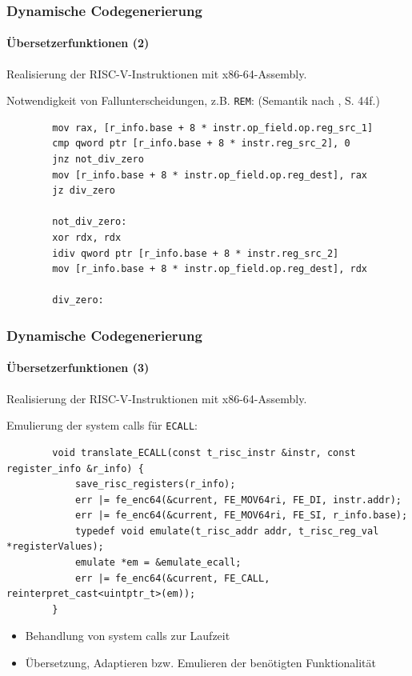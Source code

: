 \documentclass[german]{tum-presentation}
\begin{document}
\begin{frame}[fragile]
	\frametitle{Dynamische Codegenerierung}
	\framesubtitle{Übersetzerfunktionen (2)}
	
	Realisierung der RISC-V-Instruktionen mit x86-64-Assembly.
	
	\vspace{0.3cm}
	Notwendigkeit von Fallunterscheidungen, z.B. \verb!REM!: (Semantik nach , S. 44f.)
	\pause
	\begin{verbatim}
		mov rax, [r_info.base + 8 * instr.op_field.op.reg_src_1]
		cmp qword ptr [r_info.base + 8 * instr.reg_src_2], 0
		jnz not_div_zero
		mov [r_info.base + 8 * instr.op_field.op.reg_dest], rax
		jz div_zero
		
		not_div_zero:
		xor rdx, rdx
		idiv qword ptr [r_info.base + 8 * instr.reg_src_2]
		mov [r_info.base + 8 * instr.op_field.op.reg_dest], rdx
		
		div_zero:
	\end{verbatim}
\end{frame}

\begin{frame}[fragile]
	\frametitle{Dynamische Codegenerierung}
	\framesubtitle{Übersetzerfunktionen (3)}
	
	Realisierung der RISC-V-Instruktionen mit x86-64-Assembly.
	
	\vspace{0.3cm}
	Emulierung der system calls für \verb!ECALL!:
	\pause
	\begin{lstlisting}
		void translate_ECALL(const t_risc_instr &instr, const register_info &r_info) {
			save_risc_registers(r_info);
			err |= fe_enc64(&current, FE_MOV64ri, FE_DI, instr.addr);
			err |= fe_enc64(&current, FE_MOV64ri, FE_SI, r_info.base);
			typedef void emulate(t_risc_addr addr, t_risc_reg_val *registerValues);
			emulate *em = &emulate_ecall;
			err |= fe_enc64(&current, FE_CALL, reinterpret_cast<uintptr_t>(em));
		}
	\end{lstlisting}
	
	\begin{itemize}
		\item Behandlung von system calls zur Laufzeit
		\item Übersetzung, Adaptieren bzw. Emulieren der benötigten Funktionalität
	\end{itemize}
\end{frame}
\end{document}
